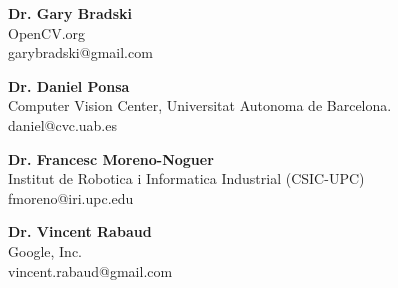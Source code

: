 \textbf{Dr. Gary Bradski}\\
OpenCV.org\\
garybradski@gmail.com

\textbf{Dr. Daniel Ponsa}\\
Computer Vision Center, Universitat Autonoma de Barcelona.\\
daniel@cvc.uab.es

\textbf{Dr. Francesc Moreno-Noguer}\\
Institut de Robotica i Informatica Industrial (CSIC-UPC)   
\\
fmoreno@iri.upc.edu

\textbf{Dr. Vincent Rabaud}\\
Google, Inc.\\
vincent.rabaud@gmail.com


